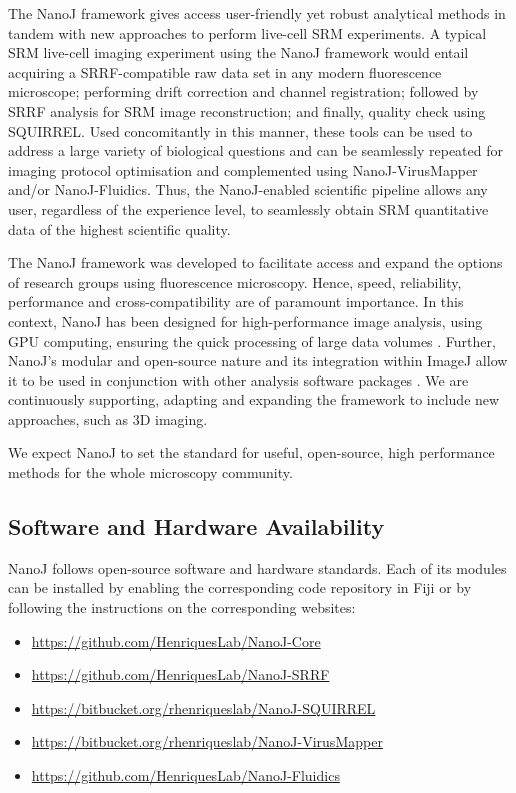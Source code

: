  The NanoJ framework gives access user-friendly yet robust analytical methods in tandem with new approaches to perform live-cell SRM experiments. A typical SRM live-cell imaging experiment using the NanoJ framework would entail acquiring a SRRF-compatible raw data set in any modern fluorescence microscope; performing drift correction and channel registration; followed by SRRF analysis for SRM image reconstruction; and finally, quality check using SQUIRREL. Used concomitantly in this manner, these tools can be used to address a large variety of biological questions and can be seamlessly repeated for imaging protocol optimisation and complemented using NanoJ-VirusMapper and/or NanoJ-Fluidics. Thus, the NanoJ-enabled scientific pipeline allows any user, regardless of the experience level, to seamlessly obtain SRM quantitative data of the highest scientific quality. 
 
 The NanoJ framework  was developed to facilitate access and expand the options of research groups using fluorescence microscopy. Hence, speed, reliability, performance and cross-compatibility are of paramount importance. In this context, NanoJ has been designed for high-performance image analysis, using GPU computing, ensuring the quick processing of large data volumes \cite{herbert2012single,pereira2015high,almada2015palm,beghin2017localization,douglass2016super}. Further, NanoJ's modular and open-source nature and its integration within ImageJ allow it to be used in conjunction with other analysis software packages \cite{sage2018super,weigert2017content,henriques2010quickpalm, laine2018milesim}. We are continuously supporting, adapting and expanding the framework to include new approaches, such as 3D imaging. 
 
 We expect NanoJ to set the standard for useful, open-source, high performance methods for the whole microscopy community.
 
\subsection*{Software and Hardware Availability}
 NanoJ follows open-source software and hardware standards. Each of its modules can be installed by enabling the corresponding code repository in Fiji or by following the instructions on the corresponding websites:
 \small
 \begin{itemize}
  \item \href{https://github.com/HenriquesLab/NanoJ-Core}{https://github.com/HenriquesLab/NanoJ-Core}
  \item \href{https://github.com/HenriquesLab/NanoJ-SRRF}{https://github.com/HenriquesLab/NanoJ-SRRF}
  \item \href{https://bitbucket.org/rhenriqueslab/nanoj-squirrel}{https://bitbucket.org/rhenriqueslab/NanoJ-SQUIRREL}
  \item \href{https://bitbucket.org/rhenriqueslab/NanoJ-VirusMapper}{https://bitbucket.org/rhenriqueslab/NanoJ-VirusMapper}
  \item \href{https://github.com/HenriquesLab/NanoJ-Fluidics}{https://github.com/HenriquesLab/NanoJ-Fluidics}
\end{itemize}


